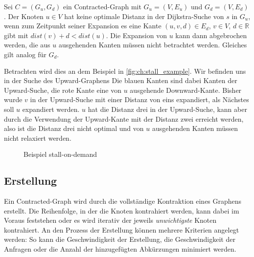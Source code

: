\begin{definition}
  Sei $C = (G_u, G_d)$ ein Contracted-Graph mit $G_u = (V, E_u)$ und $G_d = (V, E_d)$.
  Der Knoten $u \in V$ hat keine optimale Distanz in der Dijkstra-Suche von $s$ in $G_u$, wenn zum Zeitpunkt seiner Expansion es eine Kante $(u, v, d) \in E_d$, $v \in V$, $d \in \mathbb{R}$ gibt mit ${dist}(v) + d < {dist}(u)$.
  Die Expansion von $u$ kann dann abgebrochen werden, die aus $u$ ausgehenden Kanten müssen nicht betrachtet werden.
  Gleiches gilt analog für $G_d$.
\end{definition}

Betrachten wird dies an dem Beispiel in \autoref{fig:ch:stall_example}.
Wir befinden uns in der Suche des Upward-Graphens
Die blauen Kanten sind dabei Kanten der Upward-Suche, die rote Kante eine von $u$ ausgehende Downward-Kante.
Bisher wurde $v$ in der Upward-Suche mit einer Distanz von eins expandiert, als Nächstes soll $u$ expandiert werden.
$u$ hat die Distanz drei in der Upward-Suche, kann aber durch die Verwendung der Upward-Kante mit der Distanz zwei erreicht werden, also ist die Distanz drei nicht optimal und von $u$ ausgehenden Kanten müssen nicht relaxiert werden.

\begin{figure}
  \centering
  \caption{Beispiel stall-on-demand}
  \label{fig:ch:stall_example}
\end{figure}

\subsection{Erstellung}

Ein Contracted-Graph wird durch die vollständige Kontraktion eines Graphens erstellt.
Die Reihenfolge, in der die Knoten kontrahiert werden, kann dabei im Voraus feststehen oder es wird iterativ der jeweils \emph{unwichtigste} Knoten kontrahiert.
An den Prozess der Erstellung können mehrere Kriterien angelegt werden: So kann die Geschwindigkeit der Erstellung, die Geschwindigkeit der Anfragen oder die Anzahl der hinzugefügten Abkürzungen minimiert werden.

